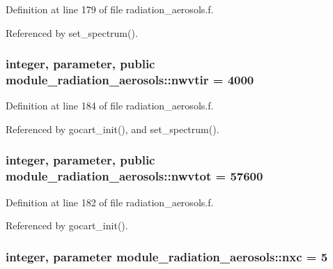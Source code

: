 Definition at line 179 of file radiation\+\_\+aerosols.\+f.



Referenced by set\+\_\+spectrum().

\subsubsection[{\texorpdfstring{nwvtir}{nwvtir}}]{\setlength{\rightskip}{0pt plus 5cm}integer, parameter, public module\+\_\+radiation\+\_\+aerosols\+::nwvtir = 4000}\hypertarget{group__module__radiation__aerosols_ga45b2c26ccba5d4fd2dfccf31bcc02824}{}\label{group__module__radiation__aerosols_ga45b2c26ccba5d4fd2dfccf31bcc02824}


Definition at line 184 of file radiation\+\_\+aerosols.\+f.



Referenced by gocart\+\_\+init(), and set\+\_\+spectrum().

\subsubsection[{\texorpdfstring{nwvtot}{nwvtot}}]{\setlength{\rightskip}{0pt plus 5cm}integer, parameter, public module\+\_\+radiation\+\_\+aerosols\+::nwvtot = 57600}\hypertarget{group__module__radiation__aerosols_gae94df49c8ff8c0ec8e6b8adb891f3c6b}{}\label{group__module__radiation__aerosols_gae94df49c8ff8c0ec8e6b8adb891f3c6b}


Definition at line 182 of file radiation\+\_\+aerosols.\+f.



Referenced by gocart\+\_\+init().

\subsubsection[{\texorpdfstring{nxc}{nxc}}]{\setlength{\rightskip}{0pt plus 5cm}integer, parameter module\+\_\+radiation\+\_\+aerosols\+::nxc = 5\hspace{0.3cm}{\ttfamily [private]}}\hypertarget{group__module__radiation__aerosols_ga1fffbb55ad2986a216b721a6c103c4cf}{}\label{group__module__radiation__aerosols_ga1fffbb55ad2986a216b721a6c103c4cf}


